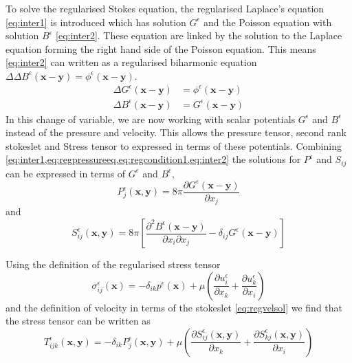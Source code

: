 To solve the regularised Stokes equation, the regularised Laplace's equation \cref{eq:inter1} is introduced which has solution $G^\epsilon$ and the Poisson equation with solution $B^\epsilon$ \cref{eq:inter2}. These equation are linked by the solution to the Laplace equation forming the right hand side of the Poisson equation. This means \cref{eq:inter2} can written as a regularised biharmonic equation $\Delta \Delta B^\epsilon  (\bm{x}-\bm{y}) = \phi^\epsilon(\bm{x}-\bm{y})$. 
\begin{subequations}
\label{eq:intermediate}
\begin{align}
    \Delta G^\epsilon(\bm{x}-\bm{y})  &= \phi^\epsilon(\bm{x}-\bm{y}) \label{eq:inter1} \\
    \Delta B^\epsilon(\bm{x}-\bm{y})  &= G^\epsilon(\bm{x}-\bm{y}) \label{eq:inter2}
\end{align}
\end{subequations}
In this change of variable, we are now working with scalar potentials $G^\epsilon$ and $B^\epsilon$ instead of the pressure and velocity. This allows the pressure tensor, second rank stokeslet and Stress tensor to expressed in terms of these potentials. Combining \cref{eq:inter1,eq:regpressureeq,eq:regcondition1,eq:inter2} the solutions for $P^\epsilon$ and $S_{ij}$ can be expressed in terms of $G^\epsilon$ and $B^\epsilon$,
\begin{equation}
\label{eq:pressuresol}
    P^\epsilon_{j}(\bm{x},\bm{y}) = 8 \pi \frac{\partial G^\epsilon(\bm{x}-\bm{y})}{\partial x_j}
\end{equation}
and
\begin{equation}
\label{eq:regstokeslet1}
    S_{ij}^\epsilon(\bm{x}, \bm{y}) = 8\pi\left[ \frac{\partial^2 B^\epsilon(\bm{x} -\bm{y})}{\partial x_i \partial x_j} - \delta_{ij}  G^\epsilon(\bm{x} -\bm{y})\right]
\end{equation}

Using the definition of the regularised stress tensor 
\begin{equation}
\label{eq:regstress}
    \sigma_{ij}^\epsilon(\bm{x}) = -\delta_{ik}p^\epsilon(\bm{x}) + \mu\left( \frac{\partial u^\epsilon_i}{\partial x_k} + \frac{\partial u^\epsilon_k}{\partial x_i} \right)
\end{equation}
and the definition of velocity in terms of the stokeslet \cref{eq:regvelsol} we find that the stress tensor can be written as 
\begin{equation}
\label{eq:regDoubleLayerSol}
    T^\epsilon_{ijk}(\bm{x},\bm{y}) = -\delta_{ik} P^\epsilon_j(\bm{x},\bm{y}) + \mu\left( \frac{\partial S^\epsilon_{ij}(\bm{x},\bm{y})}{\partial x_k} + \frac{\partial S^\epsilon_{kj}(\bm{x},\bm{y})}{\partial x_i}\right)
\end{equation}

